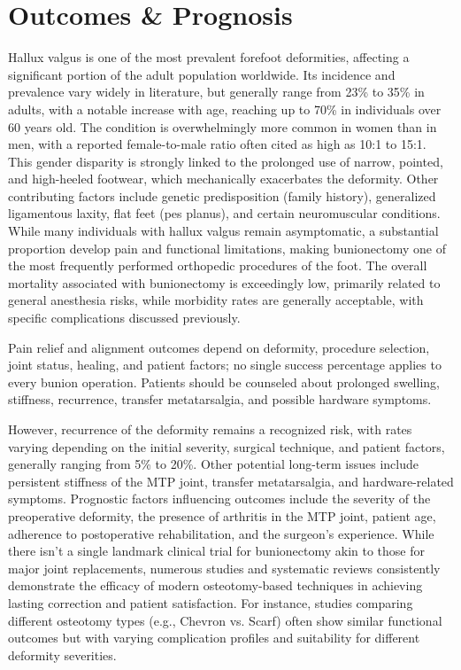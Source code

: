 \section*{Outcomes \& Prognosis}
Hallux valgus is one of the most prevalent forefoot deformities, affecting a significant portion of the adult population worldwide. Its incidence and prevalence vary widely in literature, but generally range from 23\% to 35\% in adults, with a notable increase with age, reaching up to 70\% in individuals over 60 years old. The condition is overwhelmingly more common in women than in men, with a reported female-to-male ratio often cited as high as 10:1 to 15:1. This gender disparity is strongly linked to the prolonged use of narrow, pointed, and high-heeled footwear, which mechanically exacerbates the deformity. Other contributing factors include genetic predisposition (family history), generalized ligamentous laxity, flat feet (pes planus), and certain neuromuscular conditions. While many individuals with hallux valgus remain asymptomatic, a substantial proportion develop pain and functional limitations, making bunionectomy one of the most frequently performed orthopedic procedures of the foot. The overall mortality associated with bunionectomy is exceedingly low, primarily related to general anesthesia risks, while morbidity rates are generally acceptable, with specific complications discussed previously.

Pain relief and alignment outcomes depend on deformity, procedure selection, joint status, healing, and patient factors; no single success percentage applies to every bunion operation. Patients should be counseled about prolonged swelling, stiffness, recurrence, transfer metatarsalgia, and possible hardware symptoms.

However, recurrence of the deformity remains a recognized risk, with rates varying depending on the initial severity, surgical technique, and patient factors, generally ranging from 5\% to 20\%. Other potential long-term issues include persistent stiffness of the MTP joint, transfer metatarsalgia, and hardware-related symptoms. Prognostic factors influencing outcomes include the severity of the preoperative deformity, the presence of arthritis in the MTP joint, patient age, adherence to postoperative rehabilitation, and the surgeon's experience. While there isn't a single landmark clinical trial for bunionectomy akin to those for major joint replacements, numerous studies and systematic reviews consistently demonstrate the efficacy of modern osteotomy-based techniques in achieving lasting correction and patient satisfaction. For instance, studies comparing different osteotomy types (e.g., Chevron vs. Scarf) often show similar functional outcomes but with varying complication profiles and suitability for different deformity severities.

